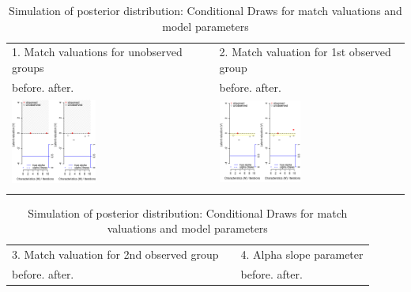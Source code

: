 \begin{table}[thbp!]
\caption{Simulation of posterior distribution: Conditional Draws for match valuations and model parameters}
\begin{center}
\begin{tabular}{lll}
1. Match valuations for unobserved groups & & 2. Match valuation for 1st observed group\\
before. \hfill after. & & before. \hfill after.\\
\includegraphics[width=0.45\textwidth]{./inputs/figures/Vunobs} & & \includegraphics[width=0.45\textwidth]{./inputs/figures/Vobs1}\\
& & \\
\end{tabular}
\begin{tabular}{lll}
3. Match valuation for 2nd observed group & & 4. Alpha slope parameter\\
before. \hfill after. & & before. \hfill after.\\

\end{tabular}
\end{center}
\end{table}
